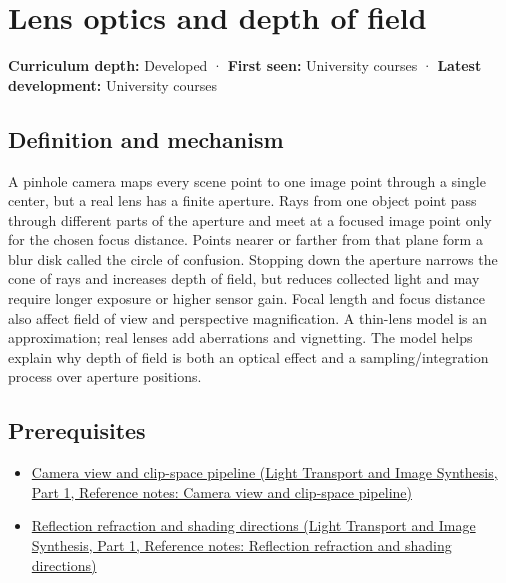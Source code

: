 \hypertarget{appendix-21f8456e2629}{}\label{referencestart:appendix-21f8456e2629}
\section{Lens optics and depth of field}\label{appendix-21f8456e2629-lens-optics-and-depth-of-field}

\hypertarget{appendix-21f8456e2629-lens-optics-and-depth-of-field}{}

\textbf{Curriculum depth:} Developed · \textbf{First seen:} University courses · \textbf{Latest development:} University courses

\begin{allmightroledefinition}

\subsection{Definition and mechanism}\label{appendix-21f8456e2629-definition-and-mechanism}

\hypertarget{appendix-21f8456e2629-definition-and-mechanism}{}

A pinhole camera maps every scene point to one image point through a single center, but a real lens has a finite aperture. Rays from one object point pass through different parts of the aperture and meet at a focused image point only for the chosen focus distance. Points nearer or farther from that plane form a blur disk called the circle of confusion. Stopping down the aperture narrows the cone of rays and increases depth of field, but reduces collected light and may require longer exposure or higher sensor gain. Focal length and focus distance also affect field of view and perspective magnification. A thin-lens model is an approximation; real lenses add aberrations and vignetting. The model helps explain why depth of field is both an optical effect and a sampling/integration process over aperture positions.

\end{allmightroledefinition}

\subsection{Prerequisites}\label{appendix-21f8456e2629-prerequisites}

\hypertarget{appendix-21f8456e2629-prerequisites}{}

\begin{itemize}
\tightlist
\item
  \href{../04-Light-Transport-and-Image-Synthesis-P01/main.pdf\#appendix-1c07d64f5e70}{Camera view and clip-space pipeline (Light Transport and Image Synthesis, Part 1, Reference notes: Camera view and clip-space pipeline)}
\item
  \href{../04-Light-Transport-and-Image-Synthesis-P01/main.pdf\#appendix-44e00863b4d5}{Reflection refraction and shading directions (Light Transport and Image Synthesis, Part 1, Reference notes: Reflection refraction and shading directions)}
\end{itemize}

